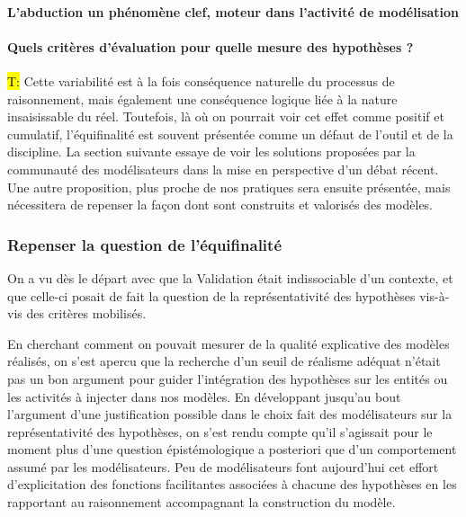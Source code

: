 \paragraph{L'abduction un phénomène clef, moteur dans l'activité de modélisation}
\label{p:abduction}



\paragraph{Quels critères d'évaluation pour quelle mesure des hypothèses ?}
\label{p:critere_evaluation}



\hl{T:}
Cette variabilité est à la fois conséquence naturelle du processus de raisonnement, mais également une conséquence logique liée à la nature insaisissable du réel. Toutefois, là où on pourrait voir cet effet comme positif et cumulatif, l'équifinalité est souvent présentée comme un défaut de l'outil et de la discipline. La section suivante essaye de voir les solutions proposées par la communauté des modélisateurs dans la mise en perspective d'un débat récent. Une autre proposition, plus proche de nos pratiques sera ensuite présentée, mais nécessitera de repenser la façon dont sont construits et valorisés des modèles. %

\subsubsection{Repenser la question de l'équifinalité}
\label{sssec:equifinalite}

On a vu dès le départ avec \textcite{Hermann1967} que la Validation était indissociable d'un contexte, et que celle-ci posait de fait la question de la représentativité des hypothèses vis-à-vis des critères mobilisés.

En cherchant comment on pouvait mesurer de la qualité explicative des modèles réalisés, on s'est apercu que la recherche d'un seuil de réalisme adéquat n'était pas un bon argument pour guider l'intégration des hypothèses sur les entités ou les activités à injecter dans nos modèles. En développant jusqu'au bout l'argument d'une justification possible dans le choix fait des modélisateurs sur la représentativité des hypothèses, on s'est rendu compte qu'il s'agissait pour le moment plus d'une question épistémologique a posteriori que d'un comportement assumé par les modélisateurs. Peu de modélisateurs font aujourd'hui cet effort d'explicitation des fonctions facilitantes associées à chacune des hypothèses en les rapportant au raisonnement accompagnant la construction du modèle.

